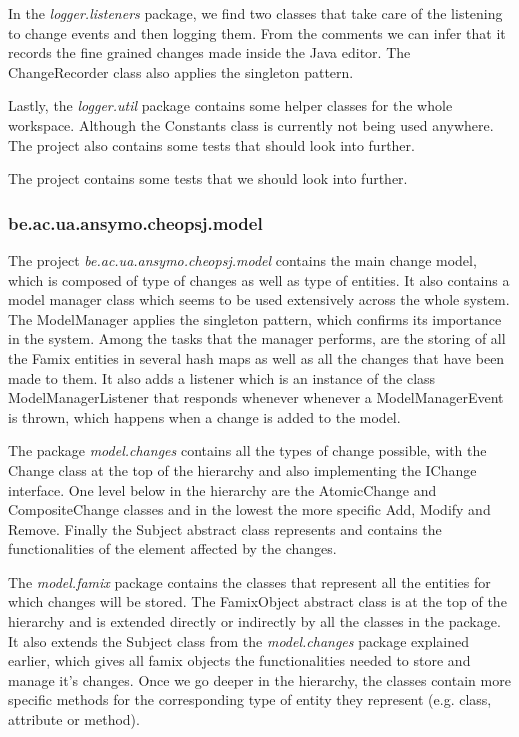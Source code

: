 \documentclass{article}
\begin{document}
In the \emph{logger.listeners} package, we find two classes that take care of the listening to change events and then logging them. From the comments we can infer that it records the fine grained changes made inside the Java editor. The ChangeRecorder class also applies the singleton pattern.

Lastly, the \emph{logger.util} package contains some helper classes for the whole workspace. Although the Constants class is currently not being used anywhere. 
The project also contains some tests that should look into further.

The project contains some tests that we should look into further.

\subsubsection{be.ac.ua.ansymo.cheopsj.model}
The project \emph{be.ac.ua.ansymo.cheopsj.model} contains the main change model, which is composed of type of changes as well as type of entities. It also contains a model manager class which seems to be used extensively across the whole system. The ModelManager applies the singleton pattern, which confirms its importance in the system. Among the tasks that the manager performs, are the storing of all the Famix entities in several hash maps as well as all the changes that have been made to them. It also adds a listener which is an instance of the class ModelManagerListener that responds whenever whenever a ModelManagerEvent is thrown, which happens when a change is added to the model.

The package \emph{model.changes} contains all the types of change possible, with the Change class at the top of the hierarchy and also implementing the IChange interface. One level below in the hierarchy are the AtomicChange and CompositeChange classes and in the lowest the more specific Add, Modify and Remove. Finally the Subject abstract class represents and contains the functionalities of the element affected by the changes.

The \emph{model.famix} package contains the classes that represent all the entities for which changes will be stored. The FamixObject abstract class is at the top of the hierarchy and is extended directly or indirectly by all the classes in the package. It also extends the Subject class from the \emph{model.changes} package explained earlier, which gives all famix objects the functionalities needed to store and manage it's changes. Once we go deeper in the hierarchy, the classes contain more specific methods for the corresponding type of entity they represent (e.g. class, attribute or method).
\end{document}
